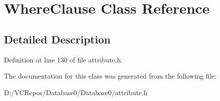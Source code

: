 \hypertarget{class_where_clause}{}\section{Where\+Clause Class Reference}
\label{class_where_clause}


\subsection{Detailed Description}


Definition at line 130 of file attribute.\+h.



The documentation for this class was generated from the following file\+:\begin{DoxyCompactItemize}
\item 
D\+:/\+V\+C\+Repos/\+Database0/\+Database0/attribute.\+h\end{DoxyCompactItemize}

